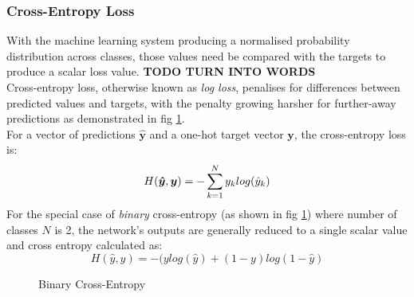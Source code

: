 \documentclass{report}
\begin{document}
	\subsubsection{Cross-Entropy Loss}	
	With the machine learning system producing a normalised probability distribution across classes, those values need be compared with the targets to produce a scalar loss value.
	\textbf{TODO TURN INTO WORDS} \\
	Cross-entropy loss, otherwise known as \textit{log loss}, penalises for differences between predicted values and targets, with the penalty growing harsher for further-away predictions as demonstrated in fig \ref{fig:cross-entropy:1}.\\
	For a vector of predictions $\bm{\hat{y}}$ and a one-hot target vector $\bm{y}$, the cross-entropy loss is:
	\begin{equation} \label{cross-entropy:1}
	H(\bm{\hat{y}}, \bm{y}) = - \sum_{k=1}^{N}y_k log(\hat{y}_k) \\
	\end{equation}  
	For the special case of \textit{binary} cross-entropy (as shown in fig \ref{fig:cross-entropy:1}) where number of classes $N$ is 2, the network's outputs are generally reduced to a single scalar value and cross entropy calculated as:
	\begin{equation} \label{cross-entropy:2}
	H(\hat{y}, y) = -(y log(\hat{y}) + (1 - y)log(1-\hat{y})
	\end{equation}
	\begin{figure}[!h]
		\centering
			\caption{Binary Cross-Entropy}
			\label{fig:cross-entropy:1}
	\end{figure}
	
\end{document}
